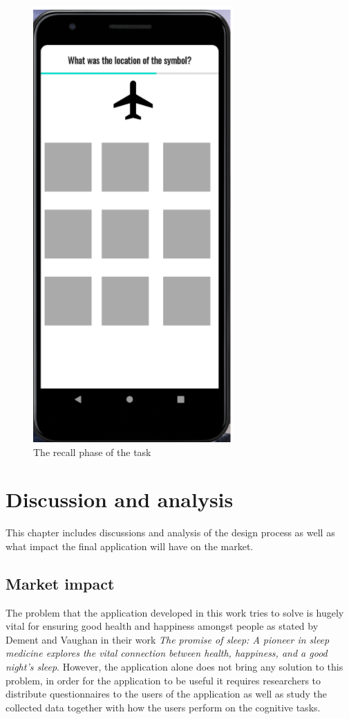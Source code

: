 \documentclass{article}
\begin{document}
\begin{figure}[!h]
  \begin{center}
    \includegraphics[scale=0.8]{Android6.png}
    \caption{The recall phase of the task
}
    \label{fig:android6}
  \end{center}
\end{figure}

\clearpage
\section{Discussion and analysis}

This chapter includes discussions and analysis of the design process as well as what impact the final application will have on the market. 

\subsection{Market impact}

The problem that the application developed in this work tries to solve is hugely vital for ensuring good health and happiness amongst people as stated by Dement and Vaughan in their work \textit{The promise of sleep: A pioneer in sleep medicine explores the vital connection between health, happiness, and a good night's sleep}.\cite{dement_promise_1999} However, the application alone does not bring any solution to this problem, in order for the application to be useful it requires researchers to distribute questionnaires to the users of the application as well as study the collected data together with how the users perform on the cognitive tasks. 
\end{document}
